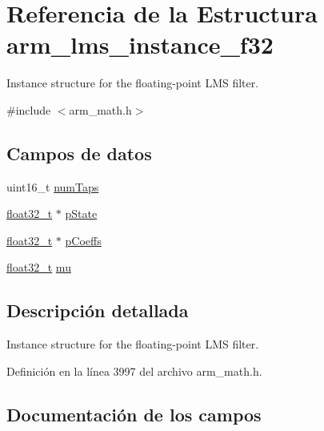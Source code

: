 \hypertarget{structarm__lms__instance__f32}{}\section{Referencia de la Estructura arm\+\_\+lms\+\_\+instance\+\_\+f32}
\label{structarm__lms__instance__f32}


Instance structure for the floating-\/point L\+MS filter.  




{\ttfamily \#include $<$arm\+\_\+math.\+h$>$}

\subsection*{Campos de datos}
\begin{DoxyCompactItemize}
\item 
uint16\+\_\+t \hyperlink{structarm__lms__instance__f32_a751941891e47f522a7f5375fe8990aac}{num\+Taps}
\item 
\hyperlink{arm__math_8h_a4611b605e45ab401f02cab15c5e38715}{float32\+\_\+t} $\ast$ \hyperlink{structarm__lms__instance__f32_a335c87e6fdc4b96601d95a5de8b9c463}{p\+State}
\item 
\hyperlink{arm__math_8h_a4611b605e45ab401f02cab15c5e38715}{float32\+\_\+t} $\ast$ \hyperlink{structarm__lms__instance__f32_aacbb8dd8eeba4b21fc2bb40076405ee3}{p\+Coeffs}
\item 
\hyperlink{arm__math_8h_a4611b605e45ab401f02cab15c5e38715}{float32\+\_\+t} \hyperlink{structarm__lms__instance__f32_a11402afa7c9b9dac4cb953fa386e74d2}{mu}
\end{DoxyCompactItemize}


\subsection{Descripción detallada}
Instance structure for the floating-\/point L\+MS filter. 

Definición en la línea 3997 del archivo arm\+\_\+math.\+h.



\subsection{Documentación de los campos}
